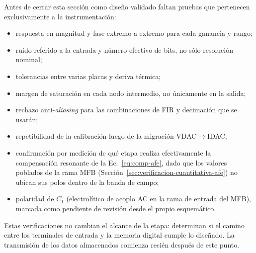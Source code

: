 Antes de cerrar esta secci\'on como dise\~no validado faltan pruebas que pertenecen
exclusivamente a la instrumentaci\'on:

\begin{itemize}
    \item respuesta en magnitud y fase extremo a extremo para cada ganancia y rango;
    \item ruido referido a la entrada y n\'umero efectivo de bits, no s\'olo resoluci\'on
    nominal;
    \item tolerancias entre varias placas y deriva t\'ermica;
    \item margen de saturaci\'on en cada nodo intermedio, no \'unicamente en la salida;
    \item rechazo anti-\emph{aliasing} para las combinaciones de FIR y decimaci\'on que se
    usar\'an;
    \item repetibilidad de la calibraci\'on luego de la migraci\'on VDAC$\to$IDAC;
    \item confirmaci\'on por medici\'on de qu\'e etapa realiza efectivamente la
    compensaci\'on resonante de la Ec.~\eqref{eq:comp-afe}, dado que los valores
    poblados de la rama MFB (Secci\'on~\ref{sec:verificacion-cuantitativa-afe}) no
    ubican sus polos dentro de la banda de campo;
    \item polaridad de $C_1$ (electrol\'itico de acoplo AC en la rama de entrada del
    MFB), marcada como pendiente de revisi\'on desde el propio esquem\'atico.
\end{itemize}

Estas verificaciones no cambian el alcance de la etapa: determinan si el camino entre
los terminales de entrada y la memoria digital cumple lo dise\~nado. La transmisi\'on de
los datos almacenados comienza reci\'en despu\'es de este punto.
